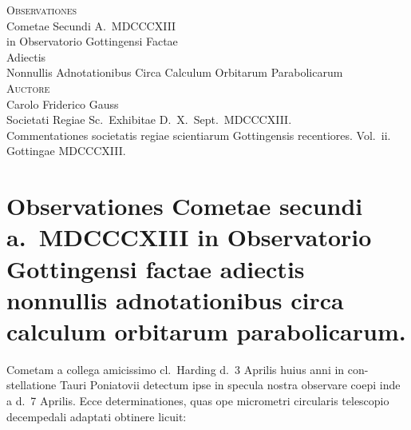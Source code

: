 \documentclass[12pt,a4paper]{article}
\begin{document}
\newpage
\thispagestyle{empty}
\begin{center}
\vspace*{2cm}

{\Large\scshape Observationes}\\[0.5em]
{\large Cometae Secundi A.\ MDCCCXIII}\\[0.5em]
{\large in Observatorio Gottingensi Factae}\\[0.5em]
{\large Adiectis}\\[0.5em]
{\large Nonnullis Adnotationibus Circa Calculum Orbitarum Parabolicarum}\\[1.5em]

{\scshape Auctore}\\[0.5em]
{\Large Carolo Friderico Gauss}\\[1em]

{\small Societati Regiae Sc.\ Exhibitae D.\ X.\ Sept.\ MDCCCXIII.}\\[1em]

{\small Commentationes societatis regiae scientiarum Gottingensis recentiores. Vol.~ii.}\\
{\small Gottingae MDCCCXIII.}
\end{center}

\newpage

\section*{Observationes Cometae secundi a.\ MDCCCXIII in Observatorio Gottingensi factae adiectis nonnullis adnotationibus circa calculum orbitarum parabolicarum.}

Cometam a collega amicissimo cl.\ Harding d.\ 3 Aprilis huius anni in con-
stellatione Tauri Poniatovii detectum ipse in specula nostra observare coepi inde
a d.\ 7 Aprilis. Ecce determinationes, quas ope micrometri circularis telescopio
decempedali adaptati obtinere licuit:
\end{document}

